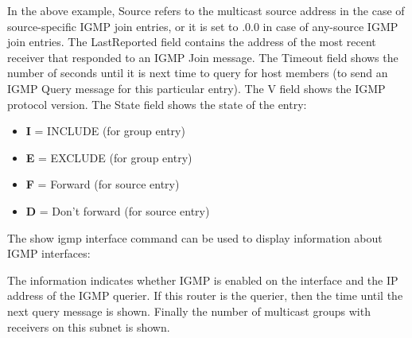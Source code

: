 In the above example, {\stt Source} refers to the multicast source
address in the case of source-specific IGMP join entries, or it is set
to {.0.0} in case of any-source IGMP join entries.  The {\stt
LastReported} field contains the address of the most recent receiver
that responded to an IGMP Join message.  The {\stt Timeout} field
shows the number of seconds until it is next time to query for host
members (\ie to send an IGMP Query message for this particular entry).
The {\stt V} field shows the IGMP protocol version.
The {\stt State} field shows the state of the entry:

\begin{itemize}
  \item {\bf I} = INCLUDE (for group entry)
  \item {\bf E} = EXCLUDE (for group entry)
  \item {\bf F} = Forward (for source entry)
  \item {\bf D} = Don't forward (for source entry)
\end{itemize}

\vspace{0.1in}
The {\stt show igmp interface} command can be used to display
information about IGMP interfaces:

\vspace{0.1in}
\noindent{}
\vspace{0.1in}

The information indicates whether IGMP is enabled on the
interface and the IP address of the IGMP querier.  If this router is
the querier, then the time until the next query message is shown.
Finally the number of multicast groups with receivers on this subnet
is shown.

